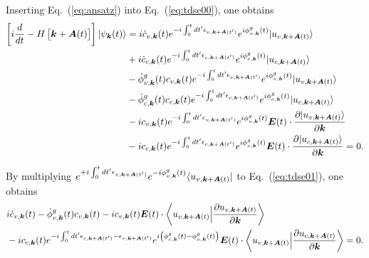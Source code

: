 Inserting Eq.~(\ref{eq:ansatz}) into Eq.~(\ref{eq:tdse00}), one obtains
\begin{align}
\left [i\frac{d}{dt}-H\left [\boldsymbol k + \boldsymbol A(t) \right ] \right ]|\psi_{\boldsymbol k}(t) \rangle &=
i \dot c_{v,\boldsymbol k}(t) e^{-i\int^t_0dt' \epsilon_{v,\boldsymbol k+ \boldsymbol A(t')}} e^{i\phi^g_{v,\boldsymbol k}(t)} |u_{v,\boldsymbol k+\boldsymbol A(t)}\rangle \nonumber \\
&+ i\dot c_{c,\boldsymbol k}(t) e^{-i\int^t_0dt' \epsilon_{c,\boldsymbol k+ \boldsymbol A(t')}} e^{i\phi^g_{c,\boldsymbol k}(t)} |u_{c,\boldsymbol k+\boldsymbol A(t)}\rangle \nonumber \\
&- \dot \phi^g_{v,\boldsymbol k}(t) c_{v,\boldsymbol k}(t) e^{-i\int^t_0dt' \epsilon_{v,\boldsymbol k+ \boldsymbol A(t')}} e^{i\phi^g_{v,\boldsymbol k}(t)} |u_{v,\boldsymbol k+\boldsymbol A(t)}\rangle \nonumber \\
&- \dot \phi^g_{c,\boldsymbol k}(t) c_{c,\boldsymbol k}(t) e^{-i\int^t_0dt' \epsilon_{c,\boldsymbol k+ \boldsymbol A(t')}} e^{i\phi^g_{c,\boldsymbol k}(t)} |u_{c,\boldsymbol k+\boldsymbol A(t)}\rangle \nonumber \\
&- i c_{v,\boldsymbol k}(t) e^{-i\int^t_0dt' \epsilon_{v,\boldsymbol k+ \boldsymbol A(t')}} e^{i\phi^g_{v,\boldsymbol k}(t)} \boldsymbol E(t)\cdot \frac{\partial |u_{v,\boldsymbol k+\boldsymbol A(t)}\rangle}{\partial \boldsymbol k} \nonumber \\
&- i c_{c,\boldsymbol k}(t) e^{-i\int^t_0dt' \epsilon_{c,\boldsymbol k+ \boldsymbol A(t')}} e^{i\phi^g_{c,\boldsymbol k}(t)} \boldsymbol E(t)\cdot \frac{\partial |u_{c,\boldsymbol k+\boldsymbol A(t)}\rangle}{\partial \boldsymbol k} = 0.
\label{eq:tdse01}
\end{align}

By multiplying $e^{+i\int^t_0dt' \epsilon_{v,\boldsymbol k+ \boldsymbol A(t')}} e^{-i\phi^g_{v,\boldsymbol k}(t)} \langle u_{v,\boldsymbol k+\boldsymbol A(t)}|$ to Eq.~(\ref{eq:tdse01}), one obtains
\begin{align}
&i \dot c_{v,\boldsymbol k}(t) - \dot \phi^g_{v,\boldsymbol k}(t) c_{v,\boldsymbol k}(t) - i c_{v,\boldsymbol k}(t) \boldsymbol E(t)\cdot \left \langle u_{v,\boldsymbol k+\boldsymbol A(t)}\Big |\frac{\partial u_{v,\boldsymbol k+\boldsymbol A(t)}}{\partial \boldsymbol k} \right \rangle \nonumber \\
&- i c_{c,\boldsymbol k}(t) e^{-i\int^t_0dt' \epsilon_{c,\boldsymbol k+ \boldsymbol A(t')}-\epsilon_{v,\boldsymbol k+ \boldsymbol A(t')}} e^{i\left (\phi^g_{c,\boldsymbol k}(t)-\phi^g_{v,\boldsymbol k}(t)\right )} 
\boldsymbol E(t)\cdot \left \langle u_{v,\boldsymbol k+\boldsymbol A(t)}\Big |\frac{\partial u_{c,\boldsymbol k+\boldsymbol A(t)}}{\partial \boldsymbol k} \right \rangle = 0.
\label{eq:eom-valence}
\end{align}

